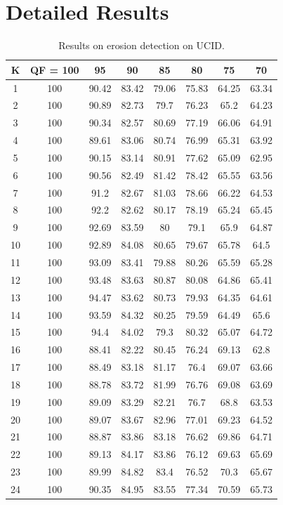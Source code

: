 \documentclass[review]{elsarticle}
\begin{document}
\section{Detailed Results}
\label{app:detailed_compress}
	\begin{longtable}{c|ccccccc}
		\caption{Results on erosion detection on UCID.}
		\label{table:uciderosion}	\\
		\hline\hline
		\textbf{K}&\textbf{QF = 100}&\textbf{95}&\textbf{90}&\textbf{85}&\textbf{80}&\textbf{75}&\textbf{70}\\
		\hline
		1&100&90.42&83.42&79.06&75.83&64.25&63.34\\
		2&100&90.89&82.73&79.7&76.23&65.2&64.23\\
		3&100&90.34&82.57&80.69&77.19&66.06&64.91\\
		4&100&89.61&83.06&80.74&76.99&65.31&63.92\\
		5&100&90.15&83.14&80.91&77.62&65.09&62.95\\
		6&100&90.56&82.49&81.42&78.42&65.55&63.56\\
		7&100&91.2&82.67&81.03&78.66&66.22&64.53\\
		8&100&92.2&82.62&80.17&78.19&65.24&65.45\\
		9&100&92.69&83.59&80&79.1&65.9&64.87\\
		10&100&92.89&84.08&80.65&79.67&65.78&64.5\\
		11&100&93.09&83.41&79.88&80.26&65.59&65.28\\
		12&100&93.48&83.63&80.87&80.08&64.86&65.41\\
		13&100&94.47&83.62&80.73&79.93&64.35&64.61\\
		14&100&93.59&84.32&80.25&79.59&64.49&65.6\\
		15&100&94.4&84.02&79.3&80.32&65.07&64.72\\
		16&100&88.41&82.22&80.45&76.24&69.13&62.8\\
		17&100&88.49&83.18&81.17&76.4&69.07&63.66\\
		18&100&88.78&83.72&81.99&76.76&69.08&63.69\\
		19&100&89.09&83.29&82.21&76.7&68.8&63.53\\
		20&100&89.07&83.67&82.96&77.01&69.23&64.52\\
		21&100&88.87&83.86&83.18&76.62&69.86&64.71\\
		22&100&89.13&84.17&83.86&76.12&69.63&65.69\\
		23&100&89.99&84.82&83.4&76.52&70.3&65.67\\
		24&100&90.35&84.95&83.55&77.34&70.59&65.73\\

\end{longtable}
\end{document}
